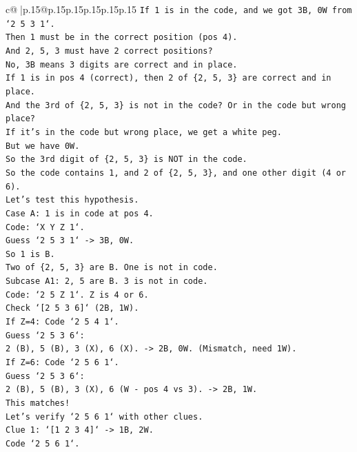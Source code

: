 \documentclass{article}
\begin{document}
{\begin{supertabular}{c@{$\;$}|p{.15\linewidth}@{}p{.15\linewidth}p{.15\linewidth}p{.15\linewidth}p{.15\linewidth}p{.15\linewidth}}
{{{\texttt{If 1 is in the code, and we got 3B, 0W from `2 5 3 1`.} \\
\texttt{Then 1 must be in the correct position (pos 4).} \\
\texttt{And 2, 5, 3 must have 2 correct positions?} \\
\texttt{No, 3B means 3 digits are correct and in place.} \\
\texttt{If 1 is in pos 4 (correct), then 2 of \{2, 5, 3\} are correct and in place.} \\
\texttt{And the 3rd of \{2, 5, 3\} is not in the code? Or in the code but wrong place?} \\
\texttt{If it's in the code but wrong place, we get a white peg.} \\
\texttt{But we have 0W.} \\
\texttt{So the 3rd digit of \{2, 5, 3\} is NOT in the code.} \\
\texttt{So the code contains 1, and 2 of \{2, 5, 3\}, and one other digit (4 or 6).} \\
\texttt{Let's test this hypothesis.} \\
\texttt{Case A: 1 is in code at pos 4.} \\
\texttt{Code: `X Y Z 1`.} \\
\texttt{Guess `2 5 3 1` {-}> 3B, 0W.} \\
\texttt{So 1 is B.} \\
\texttt{Two of \{2, 5, 3\} are B. One is not in code.} \\
\texttt{Subcase A1: 2, 5 are B. 3 is not in code.} \\
\texttt{Code: `2 5 Z 1`. Z is 4 or 6.} \\
\texttt{Check `{[}2 5 3 6{]}` (2B, 1W).} \\
\texttt{If Z=4: Code `2 5 4 1`.} \\
\texttt{Guess `2 5 3 6`:} \\
\texttt{2 (B), 5 (B), 3 (X), 6 (X). {-}> 2B, 0W. (Mismatch, need 1W).} \\
\texttt{If Z=6: Code `2 5 6 1`.} \\
\texttt{Guess `2 5 3 6`:} \\
\texttt{2 (B), 5 (B), 3 (X), 6 (W {-} pos 4 vs 3). {-}> 2B, 1W.} \\
\texttt{This matches!} \\
\texttt{Let's verify `2 5 6 1` with other clues.} \\
\texttt{Clue 1: `{[}1 2 3 4{]}` {-}> 1B, 2W.} \\
\texttt{Code `2 5 6 1`.} \\
}}}
\end{supertabular}}
\end{document}
